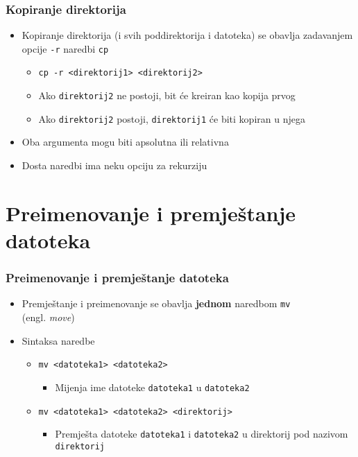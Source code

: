 \documentclass{beamer}
\begin{document}
\begin{frame}[t]
\frametitle{Kopiranje direktorija}
\begin{itemize}
  \item Kopiranje direktorija (i svih poddirektorija i datoteka) se
        obavlja zadavanjem opcije \texttt{-r} naredbi \texttt{cp}
  \begin{itemize}
    \item[] \texttt{cp -r \textless direktorij1\textgreater
                          \textless direktorij2\textgreater}
    \item Ako \texttt{direktorij2} ne postoji, bit će kreiran kao kopija
          prvog
    \item Ako \texttt{direktorij2} postoji, \texttt{direktorij1} će biti
          kopiran u njega
  \end{itemize}
  \item Oba argumenta mogu biti apsolutna ili relativna
  \item Dosta naredbi ima neku opciju za rekurziju
\end{itemize}
\end{frame}


\section{Preimenovanje i premještanje datoteka}
\begin{frame}[t]
\frametitle{Preimenovanje i premještanje datoteka}
\begin{itemize}
  \item Premještanje i preimenovanje se obavlja \textbf{jednom} naredbom
        \texttt{mv} \\(engl. \emph{move})
  \item Sintaksa naredbe
  \begin{itemize}
    \item[] \texttt{mv \textless datoteka1\textgreater
                       \textless datoteka2\textgreater}
    \begin{itemize}
      \item Mijenja ime datoteke \texttt{datoteka1} u \texttt{datoteka2}
    \end{itemize}
    \item[] \texttt{mv \textless datoteka1\textgreater
                       \textless datoteka2\textgreater
                       \textless direktorij\textgreater}
    \begin{itemize}
      \item Premješta datoteke \texttt{datoteka1} i \texttt{datoteka2}
               u direktorij pod nazivom \texttt{direktorij}
    \end{itemize}
  \end{itemize}
\end{itemize}
\end{frame}
\end{document}
